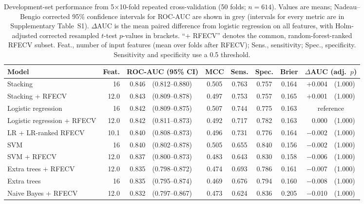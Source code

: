 \documentclass[preprint,12pt,authoryear=false]{elsarticle}
\begin{document}
\begin{table}[!htbp]
\centering
\caption{Development-set performance from 5$\times$10-fold repeated cross-validation (50 folds; $n = 614$). Values are means; Nadeau--Bengio corrected 95\% confidence intervals for ROC-AUC are shown in grey (intervals for every metric are in Supplementary Table~S1). $\Delta$AUC is the mean paired difference from logistic regression on all features, with Holm-adjusted corrected resampled $t$-test $p$-values in brackets. ``+ RFECV'' denotes the common, random-forest-ranked RFECV subset. Feat., number of input features (mean over folds after RFECV); Sens., sensitivity; Spec., specificity. Sensitivity and specificity use a 0.5 threshold.}
\label{tab:cv}
\scriptsize
\setlength{\tabcolsep}{3pt}
\begin{tabular}{lrr@{\,}lccccr@{\,}l}
\toprule
Model & Feat. & \multicolumn{2}{c}{ROC-AUC (95\% CI)} & MCC & Sens. & Spec. & Brier & \multicolumn{2}{c}{$\Delta$AUC (adj.\ $p$)} \\
\midrule
Stacking & 16 & 0.846 & {\color{gray}(0.812--0.880)} & 0.505 & 0.763 & 0.757 & 0.164 & $+$0.004 & (1.000) \\
Stacking + RFECV & 12.0 & 0.843 & {\color{gray}(0.809--0.878)} & 0.497 & 0.753 & 0.757 & 0.165 & $+$0.001 & (1.000) \\
Logistic regression & 16 & 0.842 & {\color{gray}(0.809--0.875)} & 0.507 & 0.744 & 0.775 & 0.163 & \multicolumn{2}{c}{reference} \\
Logistic regression + RFECV & 12.0 & 0.842 & {\color{gray}(0.811--0.873)} & 0.492 & 0.717 & 0.782 & 0.163 & 0.000 & (1.000) \\
LR + LR-ranked RFECV & 10.1 & 0.840 & {\color{gray}(0.808--0.873)} & 0.496 & 0.731 & 0.776 & 0.164 & $-$0.002 & (1.000) \\
SVM & 16 & 0.840 & {\color{gray}(0.802--0.878)} & 0.505 & 0.655 & 0.840 & 0.156 & $-$0.002 & (1.000) \\
SVM + RFECV & 12.0 & 0.837 & {\color{gray}(0.800--0.873)} & 0.483 & 0.643 & 0.830 & 0.158 & $-$0.006 & (1.000) \\
Extra trees + RFECV & 12.0 & 0.835 & {\color{gray}(0.798--0.872)} & 0.474 & 0.693 & 0.786 & 0.161 & $-$0.007 & (1.000) \\
Extra trees & 16 & 0.835 & {\color{gray}(0.795--0.874)} & 0.469 & 0.676 & 0.794 & 0.160 & $-$0.008 & (1.000) \\
Naive Bayes + RFECV & 12.0 & 0.832 & {\color{gray}(0.797--0.867)} & 0.473 & 0.624 & 0.836 & 0.205 & $-$0.010 & (1.000) \\

\end{tabular}
\end{table}
\end{document}
